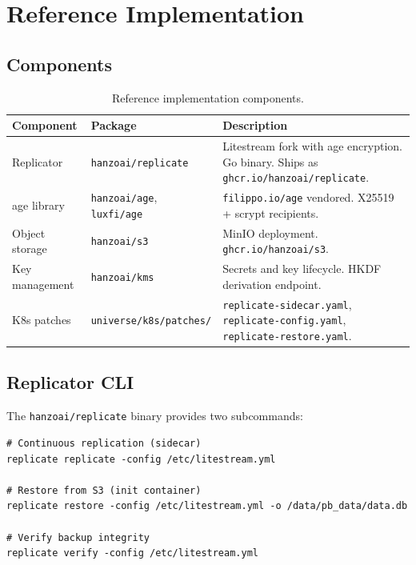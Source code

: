 \documentclass[11pt,a4paper]{article}
\begin{document}
\section{Reference Implementation}\label{sec:impl}

\subsection{Components}

\begin{table}[H]
\centering
\caption{Reference implementation components.}
\label{tab:components}
\begin{tabular}{@{}llp{6cm}@{}}
\toprule
\textbf{Component} & \textbf{Package} & \textbf{Description} \\
\midrule
Replicator & \texttt{hanzoai/replicate} & Litestream fork with age
  encryption. Go binary. Ships as
  \texttt{ghcr.io/hanzoai/replicate}. \\
age library & \texttt{hanzoai/age}, \texttt{luxfi/age} &
  \texttt{filippo.io/age} vendored. X25519 + scrypt recipients. \\
Object storage & \texttt{hanzoai/s3} & MinIO deployment.
  \texttt{ghcr.io/hanzoai/s3}. \\
Key management & \texttt{hanzoai/kms} & Secrets and key lifecycle.
  HKDF derivation endpoint. \\
K8s patches & \texttt{universe/k8s/patches/} &
  \texttt{replicate-sidecar.yaml},
  \texttt{replicate-config.yaml},
  \texttt{replicate-restore.yaml}. \\
\bottomrule
\end{tabular}
\end{table}

\subsection{Replicator CLI}

The \texttt{hanzoai/replicate} binary provides two subcommands:

\begin{lstlisting}[language={},caption={Replicator CLI usage.}]
# Continuous replication (sidecar)
replicate replicate -config /etc/litestream.yml

# Restore from S3 (init container)
replicate restore -config /etc/litestream.yml -o /data/pb_data/data.db

# Verify backup integrity
replicate verify -config /etc/litestream.yml
\end{lstlisting}
\end{document}
